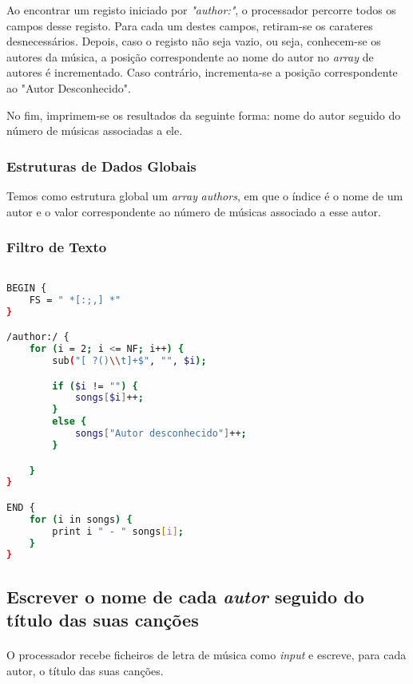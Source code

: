\documentclass{article}
\begin{document}
Ao encontrar um registo iniciado por \emph{"author:"}, o processador percorre todos os campos desse registo. Para cada um destes campos, retiram-se os carateres desnecessários. Depois, caso o registo não seja vazio, ou seja, conhecem-se os autores da música, a posição correspondente ao nome do autor no \emph{array} de autores é incrementado. Caso contrário, incrementa-se a posição correspondente ao "Autor Desconhecido".

No fim, imprimem-se os resultados da seguinte forma: nome do autor seguido do número de músicas associadas a ele.

\subsubsection{Estruturas de Dados Globais}

Temos como estrutura global um \emph{array} \emph{authors}, em que o índice é o nome de um autor e o valor correspondente ao número de músicas associado a esse autor. 

\subsubsection{Filtro de Texto}

\begin{lstlisting}[language=bash]

BEGIN {
	FS = " *[:;,] *"
}

/author:/ {
	for (i = 2; i <= NF; i++) {
		sub("[ ?()\\t]+$", "", $i);

		if ($i != "") {
			songs[$i]++;
		}
		else {
			songs["Autor desconhecido"]++;
		}

	}
}

END {
	for (i in songs) {
		print i " - " songs[i];
	}
}

\end{lstlisting}


\subsection{Escrever o nome de cada \emph{autor} seguido do título das suas canções}

\paragraph{} O processador recebe ficheiros de letra de música como \emph{input} e escreve, para cada autor, o título das suas canções.
\end{document}
